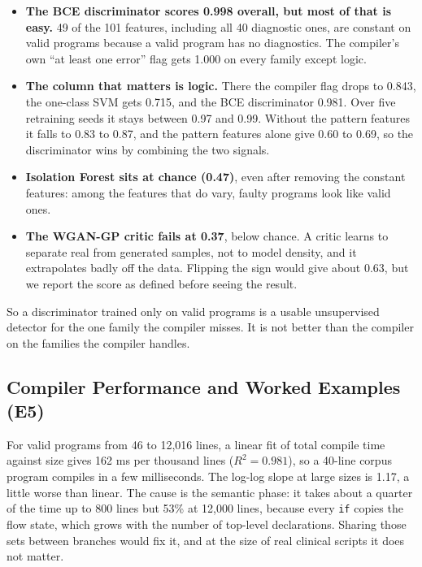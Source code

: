 \documentclass[12pt,a4paper]{article}
\newcommand{\code}[1]{\texttt{#1}}
\newcommand{\MsPerKloc}{162}
\newcommand{\ScaleRSq}{0.981}
\newcommand{\ScaleSlope}{1.17}
\begin{document}
\begin{table}[!htbp]
\centering
\caption{AUROC of valid-versus-faulty detection by fault family.}
\label{tab:anomaly}
\small
\resizebox{\textwidth}{!}{}
\end{table}

\begin{itemize}
    \item \textbf{The BCE discriminator scores 0.998 overall, but most of that is easy.} 49 of the 101 features,
    including all 40 diagnostic ones, are constant on valid programs because a valid program has no diagnostics. The
    compiler's own ``at least one error'' flag gets 1.000 on every family except logic.
    \item \textbf{The column that matters is logic.} There the compiler flag drops to 0.843, the one-class SVM gets 0.715,
    and the BCE discriminator 0.981. Over five retraining seeds it stays between 0.97 and 0.99. Without the pattern
    features it falls to 0.83 to 0.87, and the pattern features alone give 0.60 to 0.69, so the discriminator wins by
    combining the two signals.
    \item \textbf{Isolation Forest sits at chance (0.47)}, even after removing the constant features: among the features
    that do vary, faulty programs look like valid ones.
    \item \textbf{The WGAN-GP critic fails at 0.37}, below chance. A critic learns to separate real from generated
    samples, not to model density, and it extrapolates badly off the data. Flipping the sign would give about 0.63, but we
    report the score as defined before seeing the result.
\end{itemize}

So a discriminator trained only on valid programs is a usable unsupervised detector for the one family the compiler
misses. It is not better than the compiler on the families the compiler handles.

\subsection{Compiler Performance and Worked Examples (E5)}

For valid programs from 46 to 12{,}016 lines, a linear fit of total compile time against size gives \MsPerKloc{} ms per
thousand lines ($R^2=\ScaleRSq$), so a 40-line corpus program compiles in a few milliseconds. The log-log slope at large
sizes is \ScaleSlope, a little worse than linear. The cause is the semantic phase: it takes about a quarter of the time up
to 800 lines but 53\% at 12{,}000 lines, because every \code{if} copies the flow state, which grows with the number of
top-level declarations. Sharing those sets between branches would fix it, and at the size of real clinical scripts it
does not matter.
\end{document}
